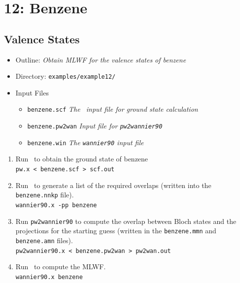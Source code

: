 \documentclass[a4paper,11pt,twoside]{article}
\begin{document}

\cleardoublepage


\section*{12: Benzene}
\subsection*{Valence States}
\begin{itemize}
\item{Outline: \it{Obtain MLWF for the valence states of benzene}}
\item{Directory: {\tt examples/example12/}}
\item{Input Files}
\begin{itemize}
\item{ {\tt benzene.scf}  {\it The \pwscf\ input file for ground state
    calculation}} 
\item{ {\tt benzene.pw2wan}  {\it Input file for {\tt pw2wannier90}}}
\item{ {\tt benzene.win}  {\it The {\tt wannier90} input file}}
\end{itemize}

\end{itemize}

\begin{enumerate}
\item Run \pwscf\ to obtain the ground state of benzene\\
{\tt pw.x < benzene.scf > scf.out}

\item Run \wannier\ to generate a list of the required overlaps (written
  into the {\tt benzene.nnkp} file).\\
{\tt wannier90.x -pp benzene}

\item Run {\tt pw2wannier90} to compute the overlap between Bloch
  states and the projections for the starting guess (written in the
  {\tt benzene.mmn} and {\tt  benzene.amn} files).\\
{\tt pw2wannier90.x < benzene.pw2wan > pw2wan.out}

\item Run \wannier\ to compute the MLWF.\\
{\tt wannier90.x benzene}

\end{enumerate}
\end{document}
